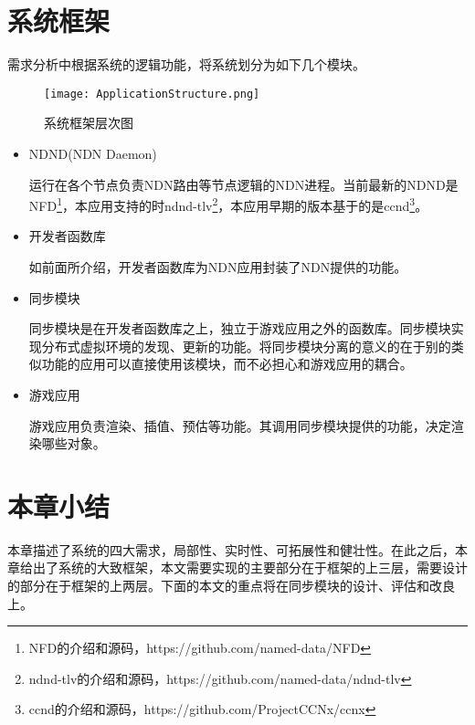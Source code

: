\section{系统框架}
\par
需求分析中根据系统的逻辑功能，将系统划分为如下几个模块。
\begin{figure}[h!]
	\centering
	\texttt{[image: ApplicationStructure.png]}
	\caption{系统框架层次图}
	\label{fig:AbstractStructure}
\end{figure}
\par
\begin{itemize}
\item
NDND(NDN Daemon)
\par
运行在各个节点负责NDN路由等节点逻辑的NDN进程。当前最新的NDND是NFD\footnote{NFD的介绍和源码，https://github.com/named-data/NFD}，本应用支持的时ndnd-tlv\footnote{ndnd-tlv的介绍和源码，https://github.com/named-data/ndnd-tlv}，本应用早期的版本基于的是ccnd\footnote{ccnd的介绍和源码，https://github.com/ProjectCCNx/ccnx}。
\item
开发者函数库
\par
如前面所介绍，开发者函数库为NDN应用封装了NDN提供的功能。
\item
同步模块
\par
同步模块是在开发者函数库之上，独立于游戏应用之外的函数库。同步模块实现分布式虚拟环境的发现、更新的功能。将同步模块分离的意义的在于别的类似功能的应用可以直接使用该模块，而不必担心和游戏应用的耦合。
\item
游戏应用
\par
游戏应用负责渲染、插值、预估等功能。其调用同步模块提供的功能，决定渲染哪些对象。
\end{itemize}
\section{本章小结}
本章描述了系统的四大需求，局部性、实时性、可拓展性和健壮性。在此之后，本章给出了系统的大致框架，本文需要实现的主要部分在于框架的上三层，需要设计的部分在于框架的上两层。下面的本文的重点将在同步模块的设计、评估和改良上。

